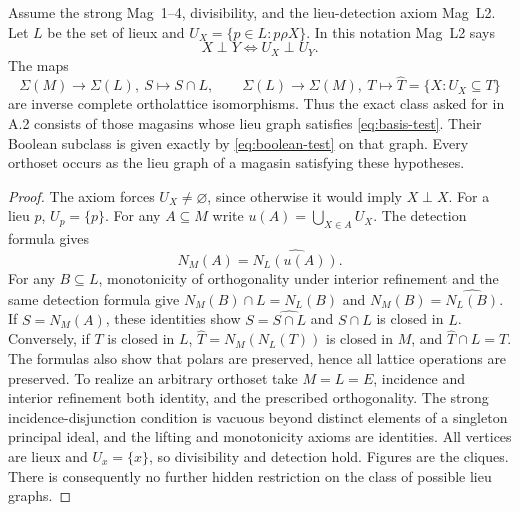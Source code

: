 \begin{theorem}
\label{SA21-A13}
Assume the strong Mag~1--4, divisibility, and the lieu-detection
axiom Mag~L2. Let $L$ be the set of lieux and
$U_X=\{p\in L:p\rho X\}$. In this notation Mag~L2 says
\[
 X\perp Y\iff U_X\perp U_Y.
\]
The maps
\[
 \Sigma(M)\longrightarrow\Sigma(L),\ S\longmapsto S\cap L,
 \qquad
 \Sigma(L)\longrightarrow\Sigma(M),\
 T\longmapsto\widehat T=\{X:U_X\subseteq T\}
\]
are inverse complete ortholattice isomorphisms. Thus the exact class
asked for in A.2 consists of those magasins whose lieu graph satisfies
\eqref{eq:basis-test}. Their Boolean subclass is given exactly by
\eqref{eq:boolean-test} on that graph. Every orthoset occurs as the
lieu graph of a magasin satisfying these hypotheses.
\end{theorem}
\begin{proof}
The axiom forces $U_X\ne\varnothing$, since otherwise it would imply
$X\perp X$. For a lieu $p$, $U_p=\{p\}$.
For any $A\subseteq M$ write $u(A)=\bigcup_{X\in A}U_X$.
The detection formula gives
\[
 N_M(A)=\widehat{N_L(u(A))}.
\]
For any $B\subseteq L$, monotonicity of orthogonality under interior
refinement and the same detection formula give
$N_M(B)\cap L=N_L(B)$ and
$N_M(B)=\widehat{N_L(B)}$.
If $S=N_M(A)$, these identities show
$S=\widehat{S\cap L}$ and $S\cap L$ is closed in $L$.
Conversely, if $T$ is closed in $L$,
$\widehat T=N_M(N_L(T))$ is closed in $M$, and
$\widehat T\cap L=T$. The formulas also show that polars are
preserved, hence all lattice operations are preserved.
To realize an arbitrary orthoset take $M=L=E$, incidence and interior
refinement both identity, and the prescribed orthogonality. The
strong incidence-disjunction condition is vacuous beyond distinct
elements of a singleton principal ideal, and the lifting and
monotonicity axioms are identities. All vertices are lieux and
$U_x=\{x\}$, so divisibility and detection hold. Figures are the
cliques. There is consequently no further hidden restriction on
the class of possible lieu graphs.
\end{proof}

